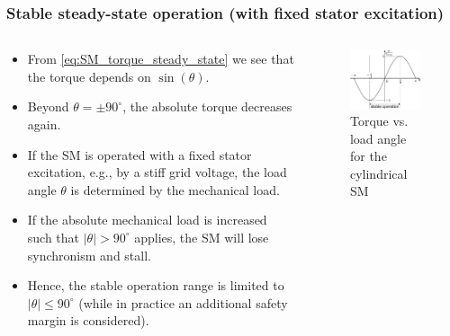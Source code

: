 \begin{frame}
	\frametitle{Stable steady-state operation (with fixed stator excitation)} 
	\begin{columns}
		\begin{column}{0.55\textwidth}
			\begin{itemize}
				\item<1-> From \eqref{eq:SM_torque_steady_state} we see that the torque depends on $\sin(\theta)$.
				\item<2-> Beyond $\theta = \pm 90^\circ$, the absolute torque decreases again.
				\item<3-> If the SM is operated with a fixed stator excitation, e.g., by a stiff grid voltage, the load angle $\theta$ is determined by the mechanical load.
				\item<4-> If the absolute mechanical load is increased such that $|\theta| > 90^\circ$ applies, the SM will lose synchronism and stall.
				\item<5-> Hence, the stable operation range is limited to $|\theta| \leq 90^\circ$ (while in practice an additional safety margin is considered).
			\end{itemize}
        \end{column}
        \begin{column}{0.45\textwidth}
			\onslide<1->
            \begin{figure}
                \centering
                \includegraphics[width=0.95\textwidth]{fig/lec07/SM_steady_state_stability.pdf}
                \caption{Torque vs. load angle for the cylindrical SM}
                \label{fig:SM_steady_state_stability}
            \end{figure}
        \end{column}
    \end{columns}
\end{frame}

